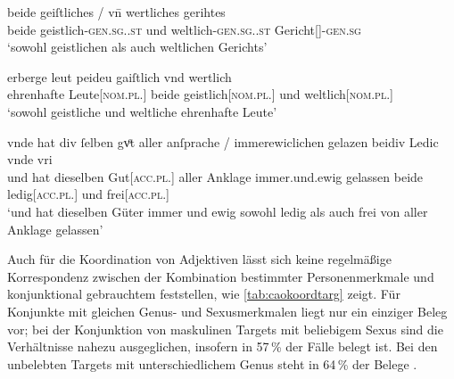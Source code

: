 \begin{exe}
\ex \label{ex:caobeidkoordtarg}
	\begin{xlist}
	\ex \label{ex:caobeidkoordtarg_1}
		\gll beide geiſtliches / vn̄ wertliches gerihtes \\
			beide geistlich-\textsc{gen.sg.\NeutI.st} {} und
			weltlich-\textsc{gen.sg.\NeutI.st} Gericht[\NeutI]-\textsc{gen.sg} \\
		\trans `sowohl geistlichen als auch weltlichen Gerichts'
			\parencites(Nr.~1764, Bamberg, 1293)[71,26]{cao3}

	\ex \label{ex:caobeidkoordtarg_2}
		\gll erberge leut peideu gaiſtlich vnd wertlich \\
			ehrenhafte Leute[\textsc{nom.pl.\MascA}] beide geistlich[\textsc{nom.pl.\MascA}]
			und weltlich[\textsc{nom.pl.\MascA}] \\
		\trans `sowohl geistliche und weltliche ehrenhafte Leute'
			\parencites(Nr.~1153, Engelthal, Kr.~Nürnberger Land, 1289)[431,44]{cao2}

	\ex \label{ex:caobeidkoordtarg_3}
		\gll vnde hat {div ſelben} gvͦt \textelp{} aller anſprache /
			immerewiclichen gelazen beidiv Ledic vnde vri \\
			und hat dieselben Gut[\textsc{acc.pl.\NeutI}] {} aller Anklage {}
			immer.und.ewig gelassen beide ledig[\textsc{acc.pl.\NeutI}] und
			frei[\textsc{acc.pl.\NeutI}] \\
		\trans `und hat dieselben Güter \textelp{} immer und ewig sowohl
			ledig als auch frei von aller Anklage gelassen'
			\parencites(Nr.~2293, Bamberg, 1295)[420,21--23]{cao3}
	\end{xlist}
\end{exe}

Auch für die Koordination von Adjektiven lässt sich keine regelmäßige
Korrespondenz zwischen der Kombination bestimmter Personenmerkmale und
konjunktional gebrauchtem  feststellen, wie
\cref{tab:caokoordtarg} zeigt. Für Konjunkte mit gleichen Genus- und
Sexusmerkmalen liegt nur ein einziger Beleg vor; bei der Konjunktion von
maskulinen Targets mit beliebigem Sexus sind die Verhältnisse nahezu
ausgeglichen, insofern in 57\,\% der Fälle  belegt ist. Bei den
unbelebten Targets mit unterschiedlichem Genus steht in 64\,\% der Belege
.

